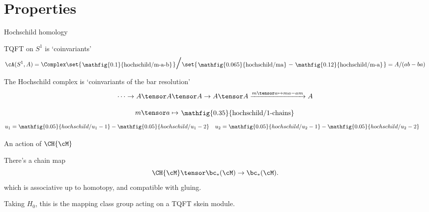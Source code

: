 \documentclass[beamer, compress]{beamer}
\begin{document}
\section{Properties}
\begin{frame}{Hochschild homology}
\begin{block}{TQFT on $S^1$ is `coinvariants'}
\vspace{-3mm}
$$\cA(S^1, A) = \Complex\set{\roundframe{\mathfig{0.1}{hochschild/m-a-b}}}\scalebox{2}{$/$}\set{\roundframe{\mathfig{0.065}{hochschild/ma}} - \roundframe{\mathfig{0.12}{hochschild/m-a}}} = A/(ab-ba)$$
\end{block}
\begin{block}{}
The Hochschild complex is `coinvariants of the bar resolution'
\vspace{-2mm}
$$ \cdots \to A \tensor A \tensor A \to A \tensor A \xrightarrow{m \tensor a \mapsto ma-am} A$$
\end{block}
\begin{thm}[$ \HC_*(A) \iso \bc_*(S^1; A)$]
$$m \tensor a \mapsto
\roundframe{\mathfig{0.35}{hochschild/1-chains}}
$$
\vspace{-5mm}
\begin{align*}
u_1 & = \mathfig{0.05}{hochschild/u_1-1} - \mathfig{0.05}{hochschild/u_1-2} & u_2  &= \mathfig{0.05}{hochschild/u_2-1} - \mathfig{0.05}{hochschild/u_2-2} 
\end{align*}
\end{thm}
\end{frame}

\begin{frame}{An action of $\CH{\cM}$}
\begin{thm}
There's a chain map
$$\CH{\cM} \tensor \bc_*(\cM) \to \bc_*(\cM).$$
which is associative up to homotopy, and compatible with gluing.
\end{thm}
\begin{block}{}
Taking $H_0$, this is the mapping class group acting on a TQFT skein module.
\end{block}
\end{frame}
\end{document}
